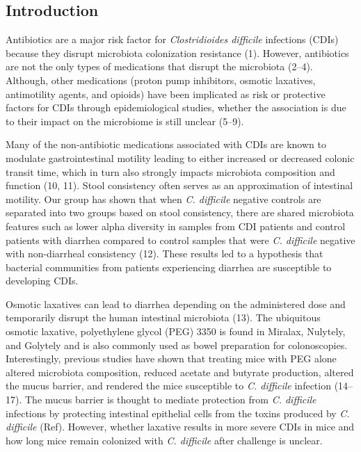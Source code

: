 \documentclass[
  11pt,
]{article}
\begin{document}
\newpage

\hypertarget{introduction}{%
\subsection{Introduction}\label{introduction}}

Antibiotics are a major risk factor for \emph{Clostridioides difficile}
infections (CDIs) because they disrupt microbiota colonization
resistance (1). However, antibiotics are not the only types of
medications that disrupt the microbiota (2--4). Although, other
medications (proton pump inhibitors, osmotic laxatives, antimotility
agents, and opioids) have been implicated as risk or protective factors
for CDIs through epidemiological studies, whether the association is due
to their impact on the microbiome is still unclear (5--9).

Many of the non-antibiotic medications associated with CDIs are known to
modulate gastrointestinal motility leading to either increased or
decreased colonic transit time, which in turn also strongly impacts
microbiota composition and function (10, 11). Stool consistency often
serves as an approximation of intestinal motility. Our group has shown
that when \emph{C. difficile} negative controls are separated into two
groups based on stool consistency, there are shared microbiota features
such as lower alpha diversity in samples from CDI patients and control
patients with diarrhea compared to control samples that were \emph{C.
difficile} negative with non-diarrheal consistency (12). These results
led to a hypothesis that bacterial communities from patients
experiencing diarrhea are susceptible to developing CDIs.

Osmotic laxatives can lead to diarrhea depending on the administered
dose and temporarily disrupt the human intestinal microbiota (13). The
ubiquitous osmotic laxative, polyethylene glycol (PEG) 3350 is found in
Miralax, Nulytely, and Golytely and is also commonly used as bowel
preparation for colonoscopies. Interestingly, previous studies have
shown that treating mice with PEG alone altered microbiota composition,
reduced acetate and butyrate production, altered the mucus barrier, and
rendered the mice susceptible to \emph{C. difficile} infection (14--17).
The mucus barrier is thought to mediate protection from \emph{C.
difficile} infections by protecting intestinal epithelial cells from the
toxins produced by \emph{C. difficile} (Ref). However, whether laxative
results in more severe CDIs in mice and how long mice remain colonized
with \emph{C. difficile} after challenge is unclear.
\end{document}
